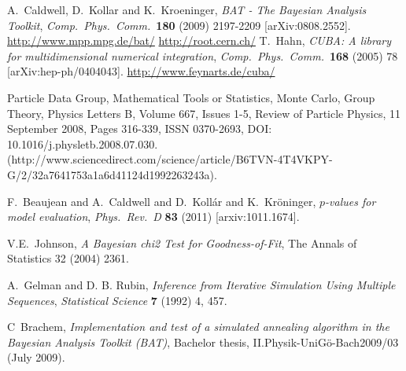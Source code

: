\documentclass[11pt, a4paper]{article}
\begin{document}

\begin{thebibliography}{99}
  A.~Caldwell, D.~Kollar and K.~Kroeninger, {\it BAT - The Bayesian
  Analysis Toolkit}, \textit{Comp.\ Phys.\ Comm.}\ {\bf 180} (2009) 2197-2209
  [arXiv:0808.2552].
  \url{http://www.mpp.mpg.de/bat/}
%
  \url{http://root.cern.ch/}
%
  T.~Hahn, {\it CUBA: A library for multidimensional numerical
  integration}, \textit{Comp.\ Phys.\ Comm.}\ {\bf 168} (2005) 78
  [arXiv:hep-ph/0404043].
%
  \url{http://www.feynarts.de/cuba/}

Particle Data Group, Mathematical Tools or Statistics, Monte Carlo, Group Theory, Physics Letters B, Volume 667, Issues 1-5, Review of Particle Physics, 11 September 2008, Pages 316-339, ISSN 0370-2693, DOI: 10.1016/j.physletb.2008.07.030.
(http://www.sciencedirect.com/science/article/B6TVN-4T4VKPY-G/2/32a7641753a1a6d41124d1992263243a).

F.~Beaujean and A.~Caldwell and D.~Koll{\'a}r and K.~Kr{\"o}ninger,
{\it $p$-values for model evaluation}, \textit{Phys.\ Rev.\ D} {\bf 83} (2011)
[arxiv:1011.1674].

V.E.~Johnson,  {\it A Bayesian chi2 Test for Goodness-of-Fit}, The Annals of Statistics 32 (2004) 2361.

A.~Gelman and D. B. Rubin, {\it Inference from Iterative Simulation Using Multiple Sequences}, \emph{Statistical Science}  {\bf 7} (1992) 4,  457.

C~Brachem, {\it Implementation and test of a simulated annealing algorithm in the Bayesian Analysis Toolkit (BAT)}, Bachelor thesis, II.Physik-UniGö-Bach2009/03 (July 2009).

\end{thebibliography}

\end{document}
